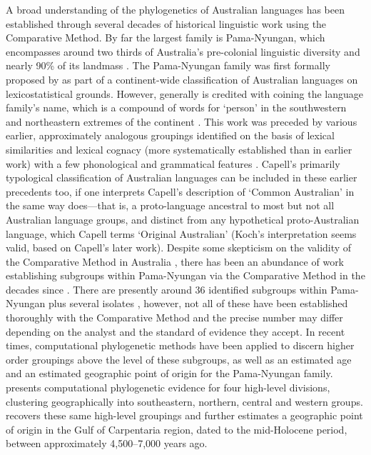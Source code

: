 A broad understanding of the phylogenetics of Australian languages has been established through several decades of historical linguistic work using the Comparative Method. By far the largest family is Pama-Nyungan, which encompasses around two thirds of Australia's pre-colonial linguistic diversity and nearly 90\% of its landmass \autocite[p.~817]{bowern_computational_2012}. The Pama-Nyungan family was first formally proposed by \textcite{ogrady_languages_1966} as part of a continent-wide classification of Australian languages on lexicostatistical grounds. However, \textcite{hale_classification_1964} generally is credited with coining the language family's name, which is a compound of words for `person' in the southwestern and northeastern extremes of the continent \autocite[see also][]{wurm_aboriginal_1963}. This work was preceded by various earlier, approximately analogous groupings identified on the basis of lexical similarities \autocites[pp.~207--212]{grey_journals_1841}[p.~iv]{moorhouse_vocabulary_1846} and lexical cognacy (more systematically established than in earlier work) with a few phonological and grammatical features \autocites{schmidt_gliederung_1919}{kroeber_relationships_1923}. Capell's \autocites{capell_structure_1937}{capell_classification_1940} primarily typological classification of Australian languages can be included in these earlier precedents too, if one interprets Capell's description of `Common Australian' in the same way \textcite{koch_methodological_2004} does---that is, a proto-language ancestral to most but not all Australian language groups, and distinct from any hypothetical proto-Australian language, which Capell terms `Original Australian' (Koch's interpretation seems valid, based on Capell's \autocite*{capell_history_1979} later work). Despite some skepticism on the validity of the Comparative Method in Australia \autocites{dixon_australian_2002}[but see][ for a counter-argument]{ogrady_coherence_2004}, there has been an abundance of work establishing subgroups within Pama-Nyungan via the Comparative Method in the decades since \textcites{ogrady_languages_1966}[see an overview and several examples in][]{bowern_australian_2004}. There are presently around 36 identified subgroups within Pama-Nyungan plus several isolates \autocite[following][]{bowern_pama-nyungan_2018}, however, not all of these have been established thoroughly with the Comparative Method and the precise number may differ depending on the analyst and the standard of evidence they accept. In recent times, computational phylogenetic methods have been applied to discern higher order groupings above the level of these subgroups, as well as an estimated age and an estimated geographic point of origin for the Pama-Nyungan family. \textcite{bowern_computational_2012} presents computational phylogenetic evidence for four high-level divisions, clustering geographically into southeastern, northern, central and western groups. \textcite{bouckaert_origin_2018} recovers these same high-level groupings and further estimates a geographic point of origin in the Gulf of Carpentaria region, dated to the mid-Holocene period, between approximately 4,500--7,000 years ago.

